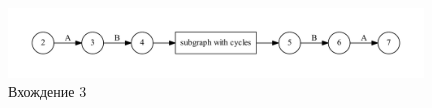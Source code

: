 \documentclass[a5paper]{article}
\begin{document}
\begin{figure}
    \begin{center}
        \includegraphics[width=11cm]{out3.pdf}
        \caption{Вхождение 3}
        \label{pic1}        
    \end{center}
\end{figure}


  


\end{document}

